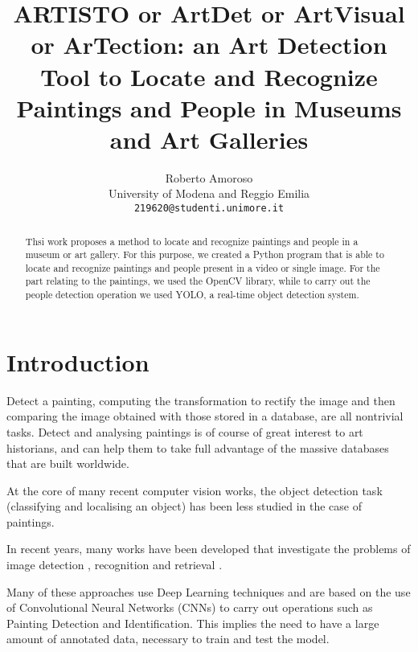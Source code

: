 \documentclass[10pt,twocolumn,letterpaper]{article}
\begin{document}
\title{ARTISTO or ArtDet or ArtVisual or ArTection: an Art Detection Tool to Locate and Recognize Paintings and People in Museums and Art Galleries}

\author{Roberto Amoroso\\
University of Modena and Reggio Emilia\\
{\tt\small 219620@studenti.unimore.it}
}

\maketitle

\begin{abstract}
   Thsi work proposes a method to locate and recognize paintings and people in a museum or art gallery. For this purpose, we created a Python program that is able to locate and recognize paintings and people present in a video or single image. For the part relating to the paintings, we used the OpenCV library, while to carry out the people detection operation we used YOLO, a real-time object detection system.
\end{abstract}

\section{Introduction}
Detect a painting, computing the transformation to rectify the image and then comparing the image obtained with those stored in a database, are all nontrivial tasks. Detect and analysing paintings is of course of great interest to art historians, and can help them to take full advantage of the massive databases that are built worldwide.

At the core of many recent computer vision works, the object detection task (classifying and localising an object) has
been less studied in the case of paintings.

In recent years, many works have been developed that investigate the problems of image detection \cite{fathy1995image,hambly2001supercosmos}, recognition \cite{martinel2013robust} and retrieval \cite{rui1999image}. 

Many of these approaches use Deep Learning techniques and are based on the use of Convolutional Neural Networks (CNNs) to carry out operations such as Painting Detection and Identification\cite{hong2019art}. This implies the need to have a large amount of annotated data, necessary to train and test the model.
\end{document}
